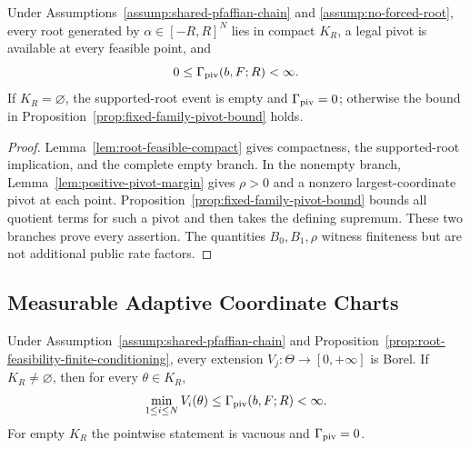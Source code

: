 \begin{proposition}
\label{prop:root-feasibility-finite-conditioning}
Under Assumptions~\ref{assump:shared-pfaffian-chain} and
\ref{assump:no-forced-root}, every root generated by
$\alpha\in[-R,R]^N$ lies in compact $K_R$, a legal pivot is available at
every feasible point, and
\[
0\leq\Gamma_{\rm piv}(b,F;R)<\infty.
\]
If $K_R=\varnothing$, the supported-root event is empty and
$\Gamma_{\rm piv}=0$; otherwise the bound in
Proposition~\ref{prop:fixed-family-pivot-bound} holds.
\end{proposition}

\begin{proof}
Lemma~\ref{lem:root-feasible-compact} gives compactness, the supported-root
implication, and the complete empty branch.  In the nonempty branch,
Lemma~\ref{lem:positive-pivot-margin} gives $\rho>0$ and a nonzero
largest-coordinate pivot at each point.  Proposition~\ref{prop:fixed-family-pivot-bound}
bounds all quotient terms for such a pivot and then takes the defining
supremum.  These two branches prove every assertion.  The quantities
$B_0,B_1,\rho$ witness finiteness but are not additional public rate
factors.
\end{proof}

\subsection{Measurable Adaptive Coordinate Charts}

\begin{lemma}
\label{lem:extended-speed-borel}
Under Assumption~\ref{assump:shared-pfaffian-chain} and
Proposition~\ref{prop:root-feasibility-finite-conditioning}, every extension
$V_j:\Theta\to[0,+\infty]$ is Borel.  If $K_R\neq\varnothing$, then for
every $\theta\in K_R$,
\[
\min_{1\leq i\leq N}V_i(\theta)
\leq\Gamma_{\rm piv}(b,F;R)<\infty.
\]
For empty $K_R$ the pointwise statement is vacuous and
$\Gamma_{\rm piv}=0$.
\end{lemma}

